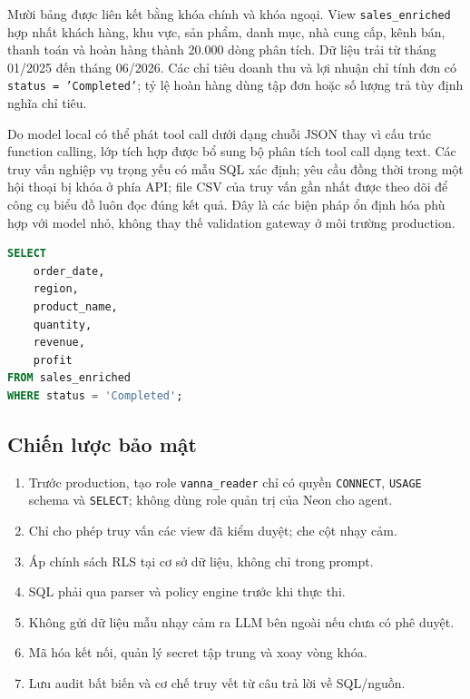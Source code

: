 \documentclass[12pt,a4paper]{article}
\begin{document}
Mười bảng được liên kết bằng khóa chính và khóa ngoại. View
\texttt{sales\_enriched} hợp nhất khách hàng, khu vực, sản phẩm, danh mục,
nhà cung cấp, kênh bán, thanh toán và hoàn hàng thành 20.000 dòng phân tích.
Dữ liệu trải từ tháng 01/2025 đến tháng 06/2026. Các chỉ tiêu doanh thu và
lợi nhuận chỉ tính đơn có \texttt{status = 'Completed'}; tỷ lệ hoàn hàng dùng
tập đơn hoặc số lượng trả tùy định nghĩa chỉ tiêu.

Do model local có thể phát tool call dưới dạng chuỗi JSON thay vì cấu trúc
function calling, lớp tích hợp được bổ sung bộ phân tích tool call dạng text.
Các truy vấn nghiệp vụ trọng yếu có mẫu SQL xác định; yêu cầu đồng thời trong
một hội thoại bị khóa ở phía API; file CSV của truy vấn gần nhất được theo dõi
để công cụ biểu đồ luôn đọc đúng kết quả. Đây là các biện pháp ổn định hóa
phù hợp với model nhỏ, không thay thế validation gateway ở môi trường
production.

\begin{lstlisting}[language=SQL,caption={Ví dụ view ngữ nghĩa giúp model local sinh SQL ổn định}]
SELECT
    order_date,
    region,
    product_name,
    quantity,
    revenue,
    profit
FROM sales_enriched
WHERE status = 'Completed';
\end{lstlisting}

\subsection{Chiến lược bảo mật}

\begin{enumerate}
  \item Trước production, tạo role \texttt{vanna\_reader} chỉ có quyền
  \texttt{CONNECT}, \texttt{USAGE} schema và \texttt{SELECT}; không dùng role
  quản trị của Neon cho agent.
  \item Chỉ cho phép truy vấn các view đã kiểm duyệt; che cột nhạy cảm.
  \item Áp chính sách RLS tại cơ sở dữ liệu, không chỉ trong prompt.
  \item SQL phải qua parser và policy engine trước khi thực thi.
  \item Không gửi dữ liệu mẫu nhạy cảm ra LLM bên ngoài nếu chưa có phê duyệt.
  \item Mã hóa kết nối, quản lý secret tập trung và xoay vòng khóa.
  \item Lưu audit bất biến và cơ chế truy vết từ câu trả lời về SQL/nguồn.
\end{enumerate}
\end{document}
